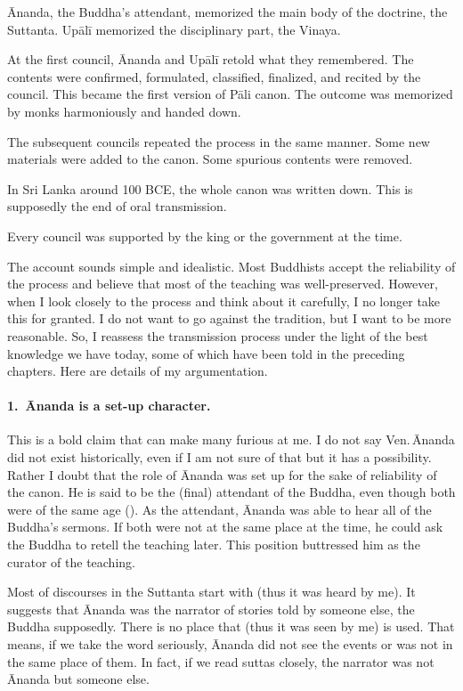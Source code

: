 \begin{compactenum}
\item \=Ananda, the Buddha's attendant, memorized the main body of the doctrine, the Suttanta. Up\=al\=i memorized the disciplinary part, the Vinaya.
\item At the first council, \=Ananda and Up\=al\=i retold what they remembered. The contents were confirmed, formulated, classified, finalized, and recited by the council. This became the first version of P\=ali canon. The outcome was memorized by monks harmoniously and handed down.
\item The subsequent councils repeated the process in the same manner. Some new materials were added to the canon. Some spurious contents were removed.
\item In Sri Lanka around 100 BCE, the whole canon was written down. This is supposedly the end of oral transmission.
\item Every council was supported by the king or the government at the time. 
\end{compactenum}

The account sounds simple and idealistic. Most Buddhists accept the reliability of the process and believe that most of the teaching was well-preserved. However, when I look closely to the process and think about it carefully, I no longer take this for granted. I do not want to go against the tradition, but I want to be more reasonable. So, I reassess the transmission process under the light of the best knowledge we have today, some of which have been told in the preceding chapters. Here are details of my argumentation.

\paragraph*{1.\ \=Ananda is a set-up character.} This is a bold claim that can make many furious at me. I do not say Ven.\,\=Ananda did not exist historically, even if I am not sure of that but it has a possibility. Rather I doubt that the role of \=Ananda was set up for the sake of reliability of the canon. He is said to be the (final) attendant of the Buddha, even though both were of the same age (). As the attendant, \=Ananda was able to hear all of the Buddha's sermons. If both were not at the same place at the time, he could ask the Buddha to retell the teaching later. This position buttressed him as the curator of the teaching.

Most of discourses in the Suttanta start with  (thus it was heard by me). It suggests that \=Ananda was the narrator of stories told by someone else, the Buddha supposedly. There is no place that  (thus it was seen by me) is used. That means, if we take the word seriously, \=Ananda did not see the events or was not in the same place of them. In fact, if we read suttas closely, the narrator was not \=Ananda but someone else.

